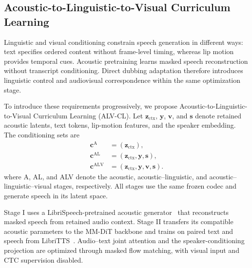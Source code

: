 
\subsection{Acoustic-to-Linguistic-to-Visual Curriculum Learning}
\label{subsec:progressive_training}
\label{sec:progressive_training}

Linguistic and visual conditioning constrain speech generation in different ways: text specifies ordered content without frame-level timing, whereas lip motion provides temporal cues. Acoustic pretraining learns masked speech reconstruction without transcript conditioning. Direct dubbing adaptation therefore introduces linguistic control and audiovisual correspondence within the same optimization stage.

To introduce these requirements progressively, we propose Acoustic-to-Linguistic-to-Visual Curriculum Learning (ALV-CL). Let $\mathbf z_{\mathrm{ctx}}$, $\mathbf y$, $\mathbf v$, and $\mathbf s$ denote retained acoustic latents, text tokens, lip-motion features, and the speaker embedding. The conditioning sets are
\begin{equation}
\begin{aligned}
\mathbf c^{\mathrm A} &= (\mathbf z_{\mathrm{ctx}}),\\
\mathbf c^{\mathrm{AL}} &= (\mathbf z_{\mathrm{ctx}},\mathbf y,\mathbf s),\\
\mathbf c^{\mathrm{ALV}} &= (\mathbf z_{\mathrm{ctx}},\mathbf y,\mathbf v,\mathbf s).
\end{aligned}
\label{eq:alv_conditioning}
\end{equation}
where A, AL, and ALV denote the acoustic, acoustic--linguistic, and acoustic--linguistic--visual stages, respectively. All stages use the same frozen codec and generate speech in its latent space.

Stage I uses a LibriSpeech-pretrained acoustic generator~\cite{panayotov2015librispeech} that reconstructs masked speech from retained audio context. Stage II transfers its compatible acoustic parameters to the MM-DiT backbone and trains on paired text and speech from LibriTTS~\cite{zen2019libritts}. Audio--text joint attention and the speaker-conditioning projection are optimized through masked flow matching, with visual input and CTC supervision disabled.

